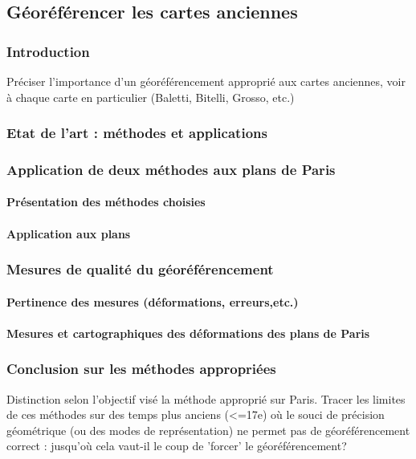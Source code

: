 \documentclass[a4paper,10pt]{article}
\begin{document}
\subsection{Géoréférencer les cartes anciennes}
\subsubsection{Introduction}
Préciser l'importance d'un géoréférencement approprié aux cartes anciennes,
 voir à chaque carte en particulier (Baletti, Bitelli, Grosso, etc.)
\subsubsection{Etat de l'art : méthodes et applications}

\subsubsection{Application de deux méthodes aux plans de Paris}
\paragraph{Présentation des méthodes choisies}
\paragraph{Application aux plans}

\subsubsection{Mesures de qualité du géoréférencement}
\paragraph{Pertinence des mesures (déformations, erreurs,etc.)}
\paragraph{Mesures et cartographiques des déformations des plans de Paris}

\subsubsection{Conclusion sur les méthodes appropriées}
Distinction selon l'objectif visé la méthode approprié sur Paris.
Tracer les limites de ces méthodes sur des temps plus anciens (<=17e) où le souci de précision géométrique (ou des modes
de représentation) ne permet pas de géoréférencement correct : jusqu'où cela vaut-il le coup de 'forcer' le géoréférencement?
\end{document}
